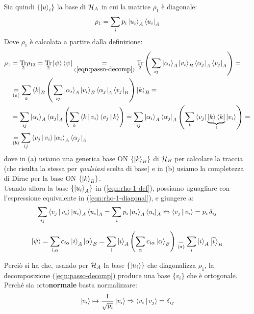 \documentclass[../../InformazioneQuantistica.tex]{subfiles}
\begin{document}
Sia quindi $\{\Ket{u}_i\}$ la base di $\mathcal{H}_A$ in cui la matrice $\rho_1$ è diagonale:
\begin{align}
\rho_1 = \sum_i p_i\Ket{u_i}_A \Bra{u_i}_A
\label{eqn:rho-1-diagonal}
\end{align}
Dove $\rho_1$ è calcolata a partire dalla definizione:
\begin{align} \nonumber
\rho_1 &= \underset{2}{\operatorname{Tr}}\rho_{12} =\underset{2}{\operatorname{Tr}}\Ket{\psi}\Bra{\psi} \underset{(\ref{eqn:passo-decomp})}{=} \underset{2}{\operatorname{Tr}} \left(\sum_{ij}\Ket{\alpha_i}_A\Ket{v_i}_B \Bra{\alpha_j}_A\Bra{v_j}_A \right) =\\ \nonumber
&\underset{(a)}{=} \sum_k \Bra{k}_B \left(\sum_{ij}\Ket{\alpha_i}_A\Ket{v_i}_B \Bra{\alpha_j}_A \Bra{v_j}_B \right)\Ket{k}_B =\\
&= \nonumber \sum_{ij} \Ket{\alpha_i}_A\Bra{\alpha_j}_A \left(\sum_k \Braket{k|v_i} \Braket{v_j|k}\right) =
 \sum_{ij} \Ket{\alpha_i}_A\Bra{\alpha_j}_A \left(\sum_k \Bra{v_j}\underbrace{\Ket{k}\Bra{k}}_{\mathbb{I}}\Ket{v_i}\right) =\\
&\underset{(b)}{=} \sum_{ij} \Braket{v_j|v_i} \Ket{\alpha_i}_A \Bra{\alpha_j}_A
\label{eqn:rho-1-def}
\end{align}
dove in (a) usiamo una generica base ON $\{\Ket{k}_B\}$ di $\mathcal{H}_B$ per calcolare la traccia (che risulta la stessa per \textit{qualsiasi} scelta di base) e in (b) usiamo la completezza di Dirac per la base ON $\{\Ket{k}_B\}$.\\
Usando allora la base $\{\Ket{u_i}_A\}$ in (\ref{eqn:rho-1-def}), possiamo uguagliare con l'espressione equivalente in (\ref{eqn:rho-1-diagonal}), e giungere a:
\begin{align*}
\sum_{ij} \Braket{v_j|v_i}\Ket{u_i}_A \Bra{u_i}_A = \sum_i p_i \Ket{u_i}_A \Bra{u_i}_A \Leftrightarrow \Braket{v_j|v_i}=p_i\,\delta_{ij}
\end{align*}

\begin{align}
\Ket{\psi}=\sum_{i, \alpha} c_{i\alpha}\Ket{i}_A\Ket{\alpha}_B = \sum_{i} \Ket{i}_A \left(\sum_\alpha c_{i\alpha} \Ket{\alpha}_B \right)\underset{(a)}{=} \sum_{i}\Ket{i}_A \Ket{\tilde{i}}_B
\label{eqn:psi-i-j}
\end{align}

Perciò si ha che, usando per $\mathcal{H}_A$ la base $\{\Ket{u_i}\}$ che diagonalizza $\rho_1$, la decomposizione (\ref{eqn:passo-decomp}) produce una base $\{v_i\}$ che è ortogonale. Perché sia orto\textbf{normale} basta normalizzare:
\begin{align*}
\Ket{v_i}\mapsto \frac{1}{\sqrt{p_i}}\Ket{v_i} \Rightarrow \Braket{v_i|v_j}=\delta_{ij}
\end{align*}
\end{document}
